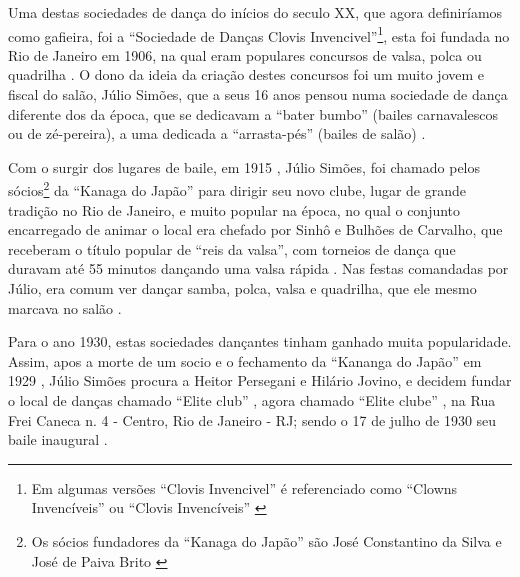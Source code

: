 Uma destas sociedades de dança do inícios do seculo XX, que agora definiríamos como gafieira, 
foi a ``Sociedade de Danças Clovis Invencivel''\footnote{Em algumas versões 
``Clovis Invencivel'' é referenciado como ``Clowns Invencíveis'' \cite[pp. 3 - cad. 3]{juliosimoes} ou 
``Clovis Invencíveis'' \cite[pp. 10]{simoesjournalbrasil1}}, 
esta foi fundada no Rio de Janeiro em 1906, 
na qual eram populares concursos de valsa, polca ou quadrilha \cite[pp. 6 - cad. B]{entrevistajuliojournalbrasil1}.
O dono da ideia da criação destes concursos foi um muito jovem e fiscal do salão, Júlio Simões,
que a seus 16 anos pensou numa sociedade de dança diferente dos da época,
que se dedicavam a ``bater bumbo'' (bailes carnavalescos ou de zé-pereira), 
a uma dedicada a ``arrasta-pés'' (bailes de salão) 
\cite[pp. 6 - cad. B]{entrevistajuliojournalbrasil1} \cite[pp. 3 - cad. 3]{juliosimoes} \cite[pp. 10]{simoesjournalbrasil1}.

Com o surgir dos lugares de baile, em 1915 \cite[pp. 1 - cad. B]{gafieira2000reis},  
Júlio Simões, foi chamado pelos sócios\footnote{Os 
sócios fundadores da ``Kanaga do Japão'' são José Constantino da Silva 
e José de Paiva Brito \cite[pp. 1 - cad. B]{gafieira2000reis}} da ``Kanaga do Japão'' para dirigir seu novo clube,
lugar de grande tradição no Rio de Janeiro, e muito popular na época,
no qual o conjunto encarregado de animar o local era chefado por Sinhô e Bulhões de Carvalho,
que receberam o título popular de ``reis da valsa'',
com torneios de dança que duravam até 55 
minutos dançando uma valsa rápida \cite[pp. 3 - cad. 3]{juliosimoes} \cite[pp. 1 - cad. B]{gafieira2000reis} \cite[pp. 6 - cad. B]{entrevistajuliojournalbrasil1}.
Nas festas comandadas por Júlio, era comum ver dançar samba, polca, 
valsa e quadrilha, que ele mesmo marcava no salão \cite[pp. 1 - cad. B]{gafieira2000reis}. 


Para o ano 1930, estas sociedades dançantes tinham ganhado muita popularidade. 
Assim, apos a morte de um socio e o fechamento da ``Kananga do Japão'' 
em 1929 \cite[pp. 3 - cad. 3]{juliosimoes}  \cite[pp. 11]{eliteinaugura} \cite[pp. 1 - cad. B]{gafieira2000reis}, 
Júlio Simões procura a Heitor Persegani e  Hilário Jovino, 
e decidem fundar o local de danças chamado ``Elite club'' \cite[pp. 11]{eliteinaugura} \cite[pp. 13]{respeitojournalbrasil1},
agora chamado ``Elite clube'' \cite[pp. 3 - cad. 3]{juliosimoes},
na Rua Frei Caneca n. 4 - Centro, Rio de Janeiro - RJ;
sendo o 17 de julho de 1930 seu baile inaugural 
\cite[pp. 11]{eliteinaugura} \cite[pp. 3 - cad. 3]{juliosimoes} \cite[pp. 10]{simoesjournalbrasil1}.

